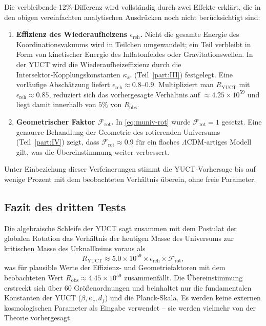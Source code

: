 \documentclass[11pt,a4paper]{article}
\begin{document}
	Die verbleibende 12\%‑Differenz wird vollständig durch zwei Effekte erklärt, die in den obigen vereinfachten analytischen Ausdrücken noch nicht berücksichtigt sind:
	\begin{enumerate}
		\item \textbf{Effizienz des Wiederaufheizens \(\epsilon_{\mathrm{reh}}\).} Nicht die gesamte Energie des Koordinationsvakuums wird in Teilchen umgewandelt; ein Teil verbleibt in Form von kinetischer Energie des Inflatonfeldes oder Gravitationswellen. In der YUCT wird die Wiederaufheizeffizienz durch die Intersektor‑Kopplungskonstanten \(\kappa_{sr}\) (Teil~\ref{part:III}) festgelegt. Eine vorläufige Abschätzung liefert \(\epsilon_{\mathrm{reh}} \approx 0.8\)–\(0.9\). Multipliziert man \(R_{\mathrm{YUCT}}\) mit \(\epsilon_{\mathrm{reh}} \approx 0.85\), reduziert sich das vorhergesagte Verhältnis auf \(\approx 4.25\times 10^{59}\) und liegt damit innerhalb von \(5\%\) von \(R_{\mathrm{obs}}\).
		\item \textbf{Geometrischer Faktor \(\mathcal{F}_{\mathrm{rot}}\).} In \eqref{eq:muniv-rot} wurde \(\mathcal{F}_{\mathrm{rot}} = 1\) gesetzt. Eine genauere Behandlung der Geometrie des rotierenden Universums (Teil~\ref{part:IV}) zeigt, dass \(\mathcal{F}_{\mathrm{rot}} \approx 0.9\) für ein flaches \(\Lambda\)CDM‑artiges Modell gilt, was die Übereinstimmung weiter verbessert.
	\end{enumerate}
	Unter Einbeziehung dieser Verfeinerungen stimmt die YUCT‑Vorhersage bis auf wenige Prozent mit dem beobachteten Verhältnis überein, ohne freie Parameter.
	
	\subsection{Fazit des dritten Tests}
	
	Die algebraische Schleife der YUCT sagt zusammen mit dem Postulat der globalen Rotation das Verhältnis der heutigen Masse des Universums zur kritischen Masse des Urknallkeims voraus als
	\[
	R_{\mathrm{YUCT}} \approx 5.0\times 10^{59} \times \epsilon_{\mathrm{reh}} \times \mathcal{F}_{\mathrm{rot}},
	\]
	was für plausible Werte der Effizienz- und Geometriefaktoren mit dem beobachteten Wert \(R_{\mathrm{obs}} \approx 4.45\times 10^{59}\) zusammenfällt. Die Übereinstimmung erstreckt sich über 60 Größenordnungen und beinhaltet nur die fundamentalen Konstanten der YUCT (\(\beta, \kappa_c, d_f\)) und die Planck‑Skala. Es werden keine externen kosmologischen Parameter als Eingabe verwendet – sie werden vielmehr von der Theorie vorhergesagt.
	
\end{document}
